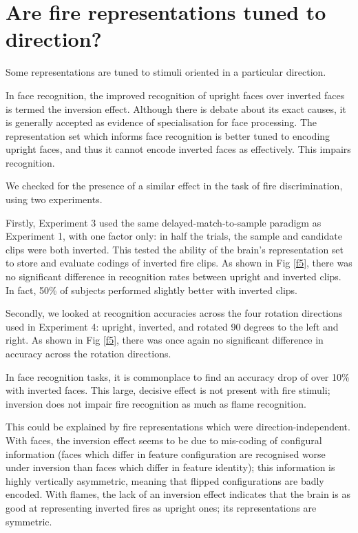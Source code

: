 \documentclass[a4paper]{article}
\begin{document}
\section{Are fire representations tuned to direction?}

Some representations are tuned to stimuli oriented in a particular direction.

In face recognition, the improved recognition of upright faces over inverted faces is termed the inversion effect. Although there is debate about its exact causes\cite{farah1995causes}, it is generally accepted as evidence of specialisation for face processing. The representation set which informs face recognition is better tuned to encoding upright faces, and thus it cannot encode inverted faces as effectively. This impairs recognition.

We checked for the presence of a similar effect in the task of fire discrimination, using two experiments. 

Firstly, Experiment 3 used the same delayed-match-to-sample paradigm as Experiment 1, with one factor only: in half the trials, the sample and candidate clips were both inverted. This tested the ability of the brain's representation set to store and evaluate codings of inverted fire clips. As shown in Fig \ref{f5}, there was no significant difference in recognition rates between upright and inverted clips. In fact, 50\% of subjects performed slightly better with inverted clips.

Secondly, we looked at recognition accuracies across the four rotation directions used in Experiment 4: upright, inverted, and rotated 90 degrees to the left and right. As shown in Fig \ref{f5}, there was once again no significant difference in accuracy across the rotation directions. 

In face recognition tasks, it is commonplace to find an accuracy drop of over 10\% with inverted faces\cite{freire2000face,yovel2005neural}. This large, decisive effect is not present with fire stimuli; inversion does not impair fire recognition as much as flame recognition.

This could be explained by fire representations which were direction-independent. With faces, the inversion effect seems to be due to mis-coding of configural information (faces which differ in feature configuration are recognised worse under inversion than faces which differ in feature identity\cite{freire2000face}); this information is highly vertically asymmetric, meaning that flipped configurations are badly encoded. With flames, the lack of an inversion effect indicates that the brain is as good at representing inverted fires as upright ones; its representations are symmetric. 
\end{document}
